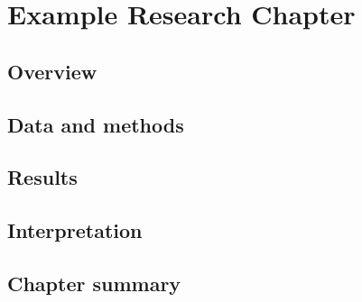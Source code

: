 \chapteropen
\chapter{Example Research Chapter}\label{ch:chapter4}
\hypertarget{ch:chapter4}{}
\glsresetall
\quoteFour

%

\section{Overview}
\section{Data and methods}
\section{Results}
\section{Interpretation}
\section{Chapter summary}

    
